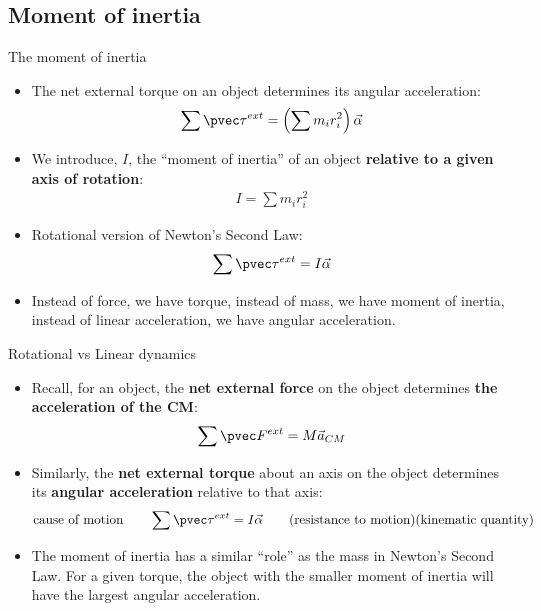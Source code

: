 \documentclass[aspectratio=169,
hyperref={colorlinks,urlcolor=blue}
]{beamer}
\begin{document}
\subsection{Moment of inertia}
\label{subsec:momentofinertia}
\begin{frame}{The moment of inertia}
\begin{itemize}
\item The net external torque on an object determines its angular acceleration:
\begin{align*}
\sum \pvec \tau^{ext}=\left(\sum m_ir_i^2  \right)\vec \alpha
\end{align*}
\item We introduce, $I$, the ``moment of inertia'' of an object \textbf{relative to a given axis of rotation}:
\begin{align*}
I=\sum m_ir_i^2  
\end{align*}
\item Rotational version of Newton's Second Law:
\begin{align*}
\sum \pvec \tau^{ext}=I\vec \alpha
\end{align*}
\item Instead of force, we have torque, instead of mass, we have moment of inertia, instead of linear acceleration, we have angular acceleration.
\end{itemize}
\end{frame}


\begin{frame}{Rotational vs Linear dynamics}
\begin{itemize}
\item Recall, for an object, the \textbf{net external force} on the object determines \textbf{the acceleration of the CM}:
\begin{align*}
\sum \pvec F^{ext}=M\vec a_{CM}
\end{align*}
\item Similarly, the \textbf{net external torque} about an axis on the object determines its \textbf{angular acceleration} relative to that axis:
\begin{align*}
\text{cause of motion}\quad\quad\sum \pvec \tau^{ext}=I\vec \alpha\quad\quad\text{(resistance to motion)(kinematic quantity)}
\end{align*}
\item The moment of inertia has a similar ``role'' as the mass in Newton's Second Law. For a given torque, the object with the smaller moment of inertia will have the largest angular acceleration.
\end{itemize}
\end{frame}
\end{document}
